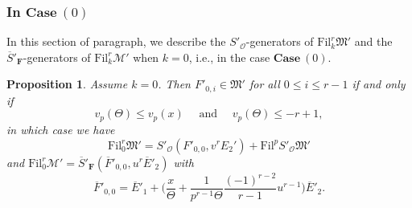 \documentclass[11pt]{amsart}
\theoremstyle{definition}
\numberwithin{equation}{subsection}
\theoremstyle{plain}
\theoremstyle{plain}
\theoremstyle{plain}
\theoremstyle{plain}
\theoremstyle{plain}
\theoremstyle{plain}
\theoremstyle{plain}
\theoremstyle{plain}
\newtheorem{prop}[equation]{Proposition}
\theoremstyle{plain}
\theoremstyle{plain}
\theoremstyle{plain}
\theoremstyle{plain}
\theoremstyle{definition}
\theoremstyle{definition}
\theoremstyle{definition}
\theoremstyle{remark}
\renewcommand{\(}{\textup{(}}
\renewcommand{\)}{\textup{)}}
\newcommand{\F}{\mathbf{F}}
\newcommand{\barS}{\overline{S}}
\newcommand{\cM}{\mathcal{M}}
\newcommand{\fM}{\mathfrak{M}}
\newcommand{\Fil}{\mathrm{Fil}}
\newcommand{\cO}{\mathcal{O}}
\newcommand{\barE}{\overline{E}}
\newcommand{\barF}{\overline{F}}
\begin{document}
\subsubsection{\textbf{In $\mathbf{Case}~(0)$}}
In this section of paragraph, we describe the $S'_\cO$-generators of $\Fil^r_{k}\fM'$ and the $\barS'_\F$-generators of $\Fil^r_{k}\cM'$ when $k=0$, i.e., in the case $\mathbf{Case}~(0)$.
\begin{prop}\label{prop: Fil-Case-0}
Assume $k=0$. Then $F'_{0,i}\in \fM'$ for all $0\leq i\leq r-1$ if and only if
\begin{equation}\label{eq: condition for k=0}
v_p(\Theta)\leq v_p(x)\quad\mbox{ and }\quad v_p(\Theta)\leq -r+1,
\end{equation}
in which case we have
    $$\Fil^r_{0}\fM'=S'_\cO (F'_{0,0},v^r E_2')+\Fil^p S'_\cO\fM'$$
    and
    $\Fil^r_{0}\cM'=\barS'_\F(\barF'_{0,0},u^r\barE'_2)$ with
    $$\barF'_{0,0}=\barE'_1 +\bigg(\frac{x}{\Theta}+\frac{1}{p^{r-1}\Theta}\frac{(-1)^{r-2}}{r-1}u^{r-1}\bigg)\barE'_2.$$
\end{prop}
\end{document}
